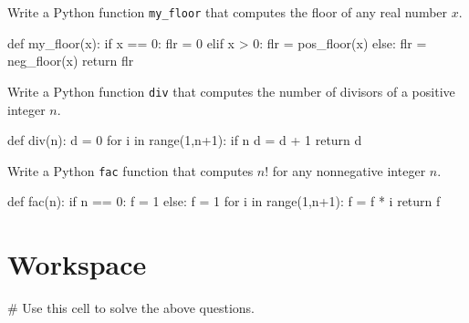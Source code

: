 \documentclass{ximera}
\begin{document}
\begin{question}
	Write a Python function \verb|my_floor| that computes the floor of any real number $x$.
\begin{hint}
\begin{sageCell}
def my_floor(x):
        if x == 0:
                flr = 0
        elif x > 0:
                flr = pos_floor(x)
        else:
                flr = neg_floor(x)
        return flr
\end{sageCell}
\end{hint}
\end{question}

\begin{question}
	Write a Python function \verb|div| that computes the number of divisors of a positive integer $n$.
\begin{hint}
\begin{sageCell}
def div(n):
        d = 0
        for i in range(1,n+1):
                if n%
                        d = d + 1
        return d
\end{sageCell}
\end{hint}
\end{question}

\begin{question}
	Write a Python \verb|fac| function that computes $n!$ for any nonnegative integer $n$.
\begin{hint}
\begin{sageCell}
def fac(n):
        if n == 0:
                f = 1
        else:
                f = 1
                for i in range(1,n+1):
                        f = f * i
        return f
\end{sageCell}
\end{hint}
\end{question}

\section{Workspace}

\begin{sageCell}
# Use this cell to solve the above questions.
\end{sageCell}
\end{document}
